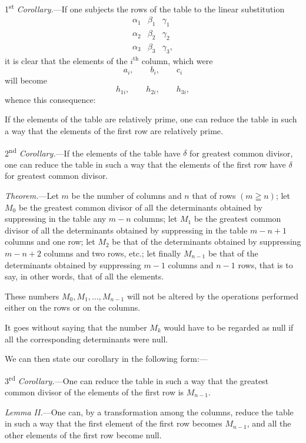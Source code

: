 \documentclass{article}
\begin{document}
1\textsuperscript{st} \emph{Corollary.}---If one subjects the rows of the table to the linear substitution
\[ \begin{matrix} \alpha_{1} & \beta_{1} & \gamma_{1} \\[1ex] \alpha_{2} & \beta_{2} & \gamma_{2} \\[1ex] \alpha_{3} & \beta_{3} & \gamma_{3}, \end{matrix} \]
it is clear that the elements of the $i^{\text{th}}$ column, which were
\[ a_{i}, \qquad b_{i}, \qquad c_{i} \]
will become
\[ h_{1i}, \qquad h_{2i}, \qquad h_{3i}, \]
whence this consequence:

If the elements of the table are relatively prime, one can reduce the table in such a way that the elements of the first row are relatively prime.

2\textsuperscript{nd} \emph{Corollary.}---If the elements of the table have $\delta$ for greatest common divisor, one can reduce the table in such a way that the elements of the first row have $\delta$ for greatest common divisor.

\emph{Theorem.}---Let $m$ be the number of columns and $n$ that of rows $(m \geqq n)$; let $M_{0}$ be the greatest common divisor of all the determinants obtained by suppressing in the table any $m-n$ columns; let $M_{1}$ be the greatest common divisor of all the determinants obtained by suppressing in the table $m-n+1$ columns and one row; let $M_{2}$ be that of the determinants obtained by suppressing $m-n+2$ columns and two rows, etc.; let finally $M_{n-1}$ be that of the determinants obtained by suppressing $m-1$ columns and $n-1$ rows, that is to say, in other words, that of all the elements.

These numbers $M_{0}, M_{1}, \ldots, M_{n-1}$ will not be altered by the operations performed either on the rows or on the columns.

It goes without saying that the number $M_{k}$ would have to be regarded as null if all the corresponding determinants were null.

We can then state our corollary in the following form:---

3\textsuperscript{rd} \emph{Corollary.}---One can reduce the table in such a way that the greatest common divisor of the elements of the first row is $M_{n-1}$.

\emph{Lemma II.}---One can, by a transformation among the columns, reduce the table in such a way that the first element of the first
row becomes $M_{n-1}$, and all the other elements of the first row become null.
\end{document}
